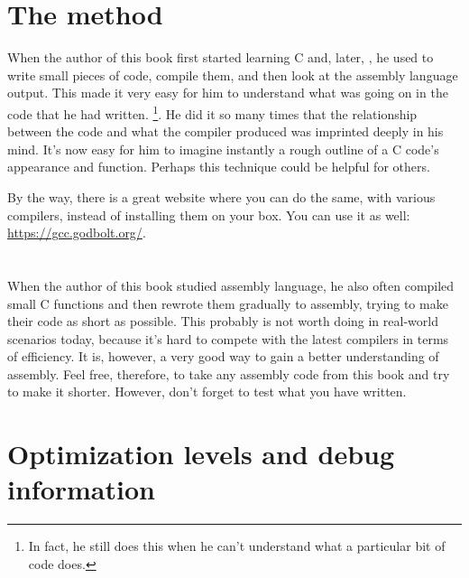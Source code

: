 \section{The method}

When the author of this book first started learning C and, later, \Cpp, he used to write small pieces of code, compile them,
and then look at the assembly language output. This made it very easy for him to understand what was going on in the code that he had written.
\footnote{In fact, he still does this when he can't understand what a particular bit of code does.}.
He did it so many times that the relationship between the \CCpp code and what the compiler produced was imprinted deeply in his mind.
It's now easy for him to imagine instantly a rough outline of a C code's appearance and function.
Perhaps this technique could be helpful for others.


By the way, there is a great website where you can do the same, with various compilers, instead of installing them on your box.
You can use it as well: \url{https://gcc.godbolt.org/}.

\section*{\Exercises}

When the author of this book studied assembly language, he also often compiled small C functions and then rewrote
them gradually to assembly, trying to make their code as short as possible.
This probably is not worth doing in real-world scenarios today,
because it's hard to compete with the latest compilers in terms of efficiency. It is, however, a very good way to gain a better understanding of assembly.
Feel free, therefore, to take any assembly code from this book and try to make it shorter.
However, don't forget to test what you have written.

\section*{Optimization levels and debug information}

